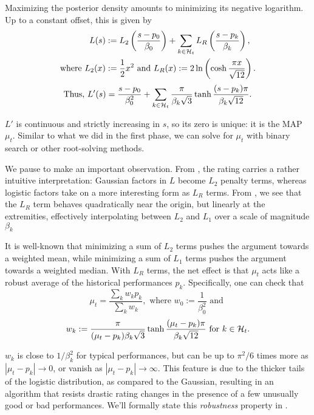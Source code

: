 Maximizing the posterior density amounts to minimizing its negative logarithm. Up to a constant offset, this is given by
\begin{align*}
L(s) &:= L_2\left(\frac{s-p_0}{\beta_0}\right)
+ \sum_{k\in{\mathcal{H}}_t} L_R\left(\frac{s-p_k}{\beta_k}\right),
\\\text{where }L_2(x) &:= \frac 12 x^2\text{ and }
L_R(x) := 2\ln\left(\cosh \frac{\pi x}{\sqrt{12}}\right).
\end{align*}
\begin{equation}
\label{eq:loss}
\text{Thus, }L'(s) = \frac{s-p_0}{\beta_0^2} + \sum_{k\in{\mathcal{H}}_t} \frac{\pi}{\beta_k\sqrt{3}} \tanh \frac{(s-p_k)\pi}{\beta_k\sqrt{12}}.
\end{equation}

$L'$ is continuous and strictly increasing in $s$, so its zero is unique: it is the MAP $\mu_t$. Similar to what we did in the first phase, we can solve for $\mu_t$ with binary search or other root-solving methods.

We pause to make an important observation. From , the rating carries a rather intuitive interpretation: Gaussian factors in $L$ become $L_2$ penalty terms, whereas logistic factors take on a more interesting form as $L_R$ terms. From , we see that the $L_R$ term behaves quadratically near the origin, but linearly at the extremities, effectively interpolating between $L_2$ and $L_1$ over a scale of magnitude $\beta_k$ 

It is well-known that minimizing a sum of $L_2$ terms pushes the argument towards a weighted mean, while minimizing a sum of $L_1$ terms pushes the argument towards a weighted median. With $L_R$ terms, the net effect is that $\mu_t$ acts like a robust average of the historical performances $p_k$. Specifically, one can check that
\[\mu_t = \frac{\sum_k w_k p_k}{\sum_k w_k}, \text{ where } w_0 := \frac{1}{\beta_0^2} \text{ and }\]
\begin{equation}
\label{eq:average}
w_k := \frac{\pi}{(\mu_t-p_k)\beta_k\sqrt{3}}\tanh\frac{(\mu_t-p_k)\pi}{\beta_k\sqrt{12}} \text{ for }k\in{\mathcal{H}}_t.
\end{equation}

$w_k$ is close to $1/\beta_k^2$ for typical performances, but can be up to $\pi^2/6$ times more as $|\mu_t-p_k| \rightarrow 0$, or vanish as $|\mu_t-p_k| \rightarrow\infty$. This feature is due to the thicker tails of the logistic distribution, as compared to the Gaussian, resulting in an algorithm that resists drastic rating changes in the presence of a few unusually good or bad performances. We'll formally state this \emph{robustness} property in .

